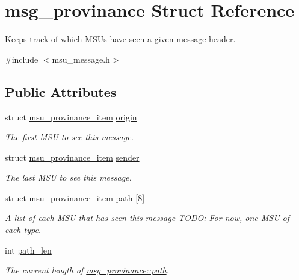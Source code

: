 \hypertarget{structmsg__provinance}{\section{msg\-\_\-provinance Struct Reference}
\label{structmsg__provinance}
}


Keeps track of which M\-S\-Us have seen a given message header.  




{\ttfamily \#include $<$msu\-\_\-message.\-h$>$}

\subsection*{Public Attributes}
\begin{DoxyCompactItemize}
\item 
struct \hyperlink{structmsu__provinance__item}{msu\-\_\-provinance\-\_\-item} \hyperlink{structmsg__provinance_a974d9fb93121e018c61b38d884b11976}{origin}
\begin{DoxyCompactList}\small\item\em The first M\-S\-U to see this message. \end{DoxyCompactList}\item 
struct \hyperlink{structmsu__provinance__item}{msu\-\_\-provinance\-\_\-item} \hyperlink{structmsg__provinance_a139a4308b5386867c609ebe22c197b97}{sender}
\begin{DoxyCompactList}\small\item\em The last M\-S\-U to see this message. \end{DoxyCompactList}\item 
struct \hyperlink{structmsu__provinance__item}{msu\-\_\-provinance\-\_\-item} \hyperlink{structmsg__provinance_a34afbc25ce0a338c85a16c9c2cc313db}{path} \mbox{[}8\mbox{]}
\begin{DoxyCompactList}\small\item\em A list of each M\-S\-U that has seen this message T\-O\-D\-O\-: For now, one M\-S\-U of each type. \end{DoxyCompactList}\item 
int \hyperlink{structmsg__provinance_af76b2286a3dd70ce44114aff1b3684a0}{path\-\_\-len}
\begin{DoxyCompactList}\small\item\em The current length of \hyperlink{structmsg__provinance_a34afbc25ce0a338c85a16c9c2cc313db}{msg\-\_\-provinance\-::path}. \end{DoxyCompactList}\end{DoxyCompactItemize}


